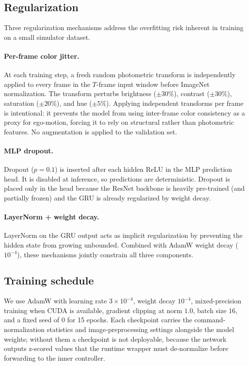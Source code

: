 \documentclass[10pt,twocolumn,letterpaper]{article}
\begin{document}
\subsection{Regularization}

Three regularization mechanisms address the overfitting risk inherent in training on a small simulator dataset.

\paragraph{Per-frame color jitter.} At each training step, a fresh random photometric transform is independently applied to every frame in the $T$-frame input window before ImageNet normalization. The transform perturbs brightness ($\pm30\%$), contrast ($\pm30\%$), saturation ($\pm20\%$), and hue ($\pm5\%$). Applying independent transforms per frame is intentional: it prevents the model from using inter-frame color consistency as a proxy for ego-motion, forcing it to rely on structural rather than photometric features. No augmentation is applied to the validation set.

\paragraph{MLP dropout.} Dropout ($p{=}0.1$) is inserted after each hidden ReLU in the MLP prediction head. It is disabled at inference, so predictions are deterministic. Dropout is placed only in the head because the ResNet backbone is heavily pre-trained (and partially frozen) and the GRU is already regularized by weight decay.

\paragraph{LayerNorm + weight decay.} LayerNorm on the GRU output acts as implicit regularization by preventing the hidden state from growing unbounded. Combined with AdamW weight decay ($10^{-4}$), these mechanisms jointly constrain all three components.

\subsection{Training schedule}

We use AdamW with learning rate $3\!\times\!10^{-4}$, weight decay $10^{-4}$, mixed-precision training when CUDA is available, gradient clipping at norm $1.0$, batch size $16$, and a fixed seed of $0$ for 15 epochs. Each checkpoint carries the command-normalization statistics and image-preprocessing settings alongside the model weights; without them a checkpoint is not deployable, because the network outputs z-scored values that the runtime wrapper must de-normalize before forwarding to the inner controller.
\end{document}
